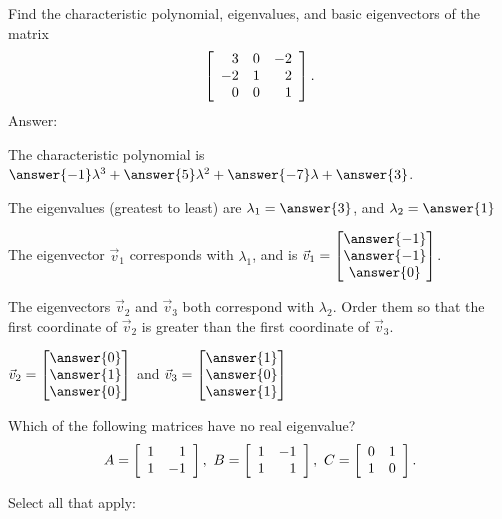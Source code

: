 \documentclass{ximera}
\begin{document}
\begin{problem}
  Find the characteristic polynomial, eigenvalues, and basic
  eigenvectors of the matrix
  \begin{equation*}
    \startmat{rrr}
      3 &   0 &  -2 \\
      -2 &   1 &   2 \\
      0 &   0 &   1 \\
    \stopmat.
  \end{equation*}
  Answer:

  The characteristic polynomial is $\answer{-1}\lambda^3+\answer{5}\lambda^2+\answer{-7}\lambda+\answer{3}$.

  The eigenvalues (greatest to least) are $\lambda_1=\answer{3}$, and $\lambda_2=\answer{1}$

  The eigenvector $\vec{v}_1$ corresponds with $\lambda_1$, and is $\vec{v}_1=\begin{bmatrix}
    \answer{-1}\\
    \answer{-1} \\
    \answer{0}
  \end{bmatrix}$.
  
  The eigenvectors $\vec{v}_2$ and $\vec{v}_3$ both correspond with $\lambda_2$. Order them so that the first coordinate of $\vec{v}_2$ is greater than the first coordinate of $\vec{v}_3$. 
  
  $\vec{v}_2=\begin{bmatrix}
    \answer{0}\\
    \answer{1}\\
    \answer{0}
  \end{bmatrix}$ and $\vec{v}_3=\begin{bmatrix}
    \answer{1}\\
    \answer{0}\\
    \answer{1}
  \end{bmatrix}$
\end{problem}

\begin{problem}
  Which of the following matrices have no real eigenvalue?
  \begin{equation*}
    A = \startmat{rr}
      1 & 1 \\
      1 & -1 \\
    \stopmat,
    \quad
    B = \startmat{rr}
      1 & -1 \\
      1 & 1 \\
    \stopmat,
    \quad
    C = \startmat{rr}
      0 & 1 \\
      1 & 0 \\
    \stopmat.
  \end{equation*}

  Select all that apply:

  \begin{selectAll}
  \end{selectAll}
\end{problem}
\end{document}
